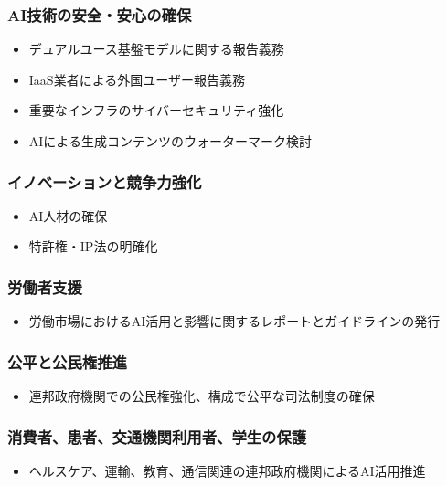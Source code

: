 \subsubsection*{AI技術の安全・安心の確保}

\begin{itemize}
    \item デュアルユース基盤モデルに関する報告義務
    \item IaaS業者による外国ユーザー報告義務
    \item 重要なインフラのサイバーセキュリティ強化
    \item AIによる生成コンテンツのウォーターマーク検討
\end{itemize}

\subsubsection*{イノベーションと競争力強化}

\begin{itemize}
    \item AI人材の確保
    \item 特許権・IP法の明確化
\end{itemize}

\subsubsection*{労働者支援}

\begin{itemize}
    \item 労働市場におけるAI活用と影響に関するレポートとガイドラインの発行
\end{itemize}

\subsubsection*{公平と公民権推進}

\begin{itemize}
    \item 連邦政府機関での公民権強化、構成で公平な司法制度の確保
\end{itemize}

\subsubsection*{消費者、患者、交通機関利用者、学生の保護}

\begin{itemize}
    \item ヘルスケア、運輸、教育、通信関連の連邦政府機関によるAI活用推進
\end{itemize}

